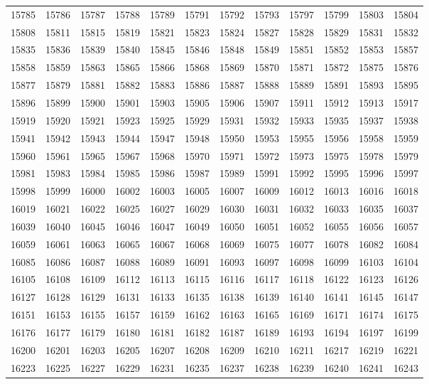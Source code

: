 \begin{center}
\begin{longtable}{llllllllllll}
15785 &15786 &15787 &15788 &15789 &15791 &15792 &15793 &15797 &15799 &15803 &15804 \\
15808 &15811 &15815 &15819 &15821 &15823 &15824 &15827 &15828 &15829 &15831 &15832 \\
15835 &15836 &15839 &15840 &15845 &15846 &15848 &15849 &15851 &15852 &15853 &15857 \\
15858 &15859 &15863 &15865 &15866 &15868 &15869 &15870 &15871 &15872 &15875 &15876 \\
15877 &15879 &15881 &15882 &15883 &15886 &15887 &15888 &15889 &15891 &15893 &15895 \\
15896 &15899 &15900 &15901 &15903 &15905 &15906 &15907 &15911 &15912 &15913 &15917 \\
15919 &15920 &15921 &15923 &15925 &15929 &15931 &15932 &15933 &15935 &15937 &15938 \\
15941 &15942 &15943 &15944 &15947 &15948 &15950 &15953 &15955 &15956 &15958 &15959 \\
15960 &15961 &15965 &15967 &15968 &15970 &15971 &15972 &15973 &15975 &15978 &15979 \\
15981 &15983 &15984 &15985 &15986 &15987 &15989 &15991 &15992 &15995 &15996 &15997 \\
15998 &15999 &16000 &16002 &16003 &16005 &16007 &16009 &16012 &16013 &16016 &16018 \\
16019 &16021 &16022 &16025 &16027 &16029 &16030 &16031 &16032 &16033 &16035 &16037 \\
16039 &16040 &16045 &16046 &16047 &16049 &16050 &16051 &16052 &16055 &16056 &16057 \\
16059 &16061 &16063 &16065 &16067 &16068 &16069 &16075 &16077 &16078 &16082 &16084 \\
16085 &16086 &16087 &16088 &16089 &16091 &16093 &16097 &16098 &16099 &16103 &16104 \\
16105 &16108 &16109 &16112 &16113 &16115 &16116 &16117 &16118 &16122 &16123 &16126 \\
16127 &16128 &16129 &16131 &16133 &16135 &16138 &16139 &16140 &16141 &16145 &16147 \\
16151 &16153 &16155 &16157 &16159 &16162 &16163 &16165 &16169 &16171 &16174 &16175 \\
16176 &16177 &16179 &16180 &16181 &16182 &16187 &16189 &16193 &16194 &16197 &16199 \\
16200 &16201 &16203 &16205 &16207 &16208 &16209 &16210 &16211 &16217 &16219 &16221 \\
16223 &16225 &16227 &16229 &16231 &16235 &16237 &16238 &16239 &16240 &16241 &16243 \\

\end{longtable}
\end{center}
